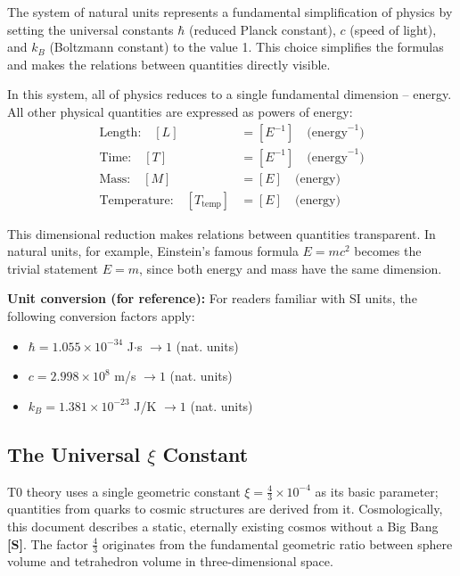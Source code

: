 	The system of natural units represents a fundamental simplification of physics by setting the universal constants $\hbar$ (reduced Planck constant), $c$ (speed of light), and $k_B$ (Boltzmann constant) to the value 1. This choice simplifies the formulas and makes the relations between quantities directly visible.
	
	In this system, all of physics reduces to a single fundamental dimension -- energy. All other physical quantities are expressed as powers of energy:
	\begin{align}
		\text{Length:} \quad [L] &= [E^{-1}] \quad \text{(energy}^{-1}\text{)} \\
		\text{Time:} \quad [T] &= [E^{-1}] \quad \text{(energy}^{-1}\text{)} \\
		\text{Mass:} \quad [M] &= [E] \quad \text{(energy)} \\
		\text{Temperature:} \quad [T_{\text{temp}}] &= [E] \quad \text{(energy)}
	\end{align}
	
	This dimensional reduction makes relations between quantities transparent. In natural units, for example, Einstein's famous formula $E = mc^2$ becomes the trivial statement $E = m$, since both energy and mass have the same dimension.
	
	\textbf{Unit conversion (for reference):}
	For readers familiar with SI units, the following conversion factors apply:
	\begin{itemize}
		\item $\hbar = 1.055 \times 10^{-34}$ J$\cdot$s $\rightarrow 1$ (nat. units)
		\item $c = 2.998 \times 10^8$ m/s $\rightarrow 1$ (nat. units)  
		\item $k_B = 1.381 \times 10^{-23}$ J/K $\rightarrow 1$ (nat. units)
	\end{itemize}
	
	\subsection{The Universal $\xi$ Constant}
	
	\begin{important}
		T0 theory uses a single geometric constant $\xi = \frac{4}{3} \times 10^{-4}$ as its basic parameter; quantities from quarks to cosmic structures are derived from it. Cosmologically, this document describes a static, eternally existing cosmos without a Big Bang \textbf{[S]}. The factor $\frac{4}{3}$ originates from the fundamental geometric ratio between sphere volume and tetrahedron volume in three-dimensional space.
	\end{important}
	
